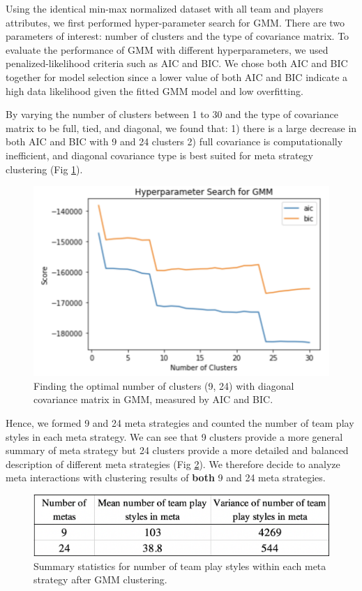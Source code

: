 \documentclass{article}
\begin{document}
Using the identical min-max normalized dataset with all team and players attributes, we first performed hyper-parameter search for GMM. There are two parameters of interest: number of clusters and the type of covariance matrix. To evaluate the performance of GMM with different hyperparameters, we used penalized-likelihood criteria such as AIC and BIC. We chose both AIC and BIC together for model selection since a lower value of both AIC and BIC indicate a high data likelihood given the fitted GMM model and low overfitting.

By varying the number of clusters between 1 to 30 and the type of covariance matrix to be full, tied, and diagonal, we found that: 1) there is a large decrease in both AIC and BIC with 9 and 24 clusters 2) full covariance is computationally inefficient, and diagonal covariance type is best suited for meta strategy clustering (Fig \ref{fig:gmm}).

\begin{figure}[H]
\centering
\includegraphics[width=.5\textwidth]{gmm.png}
\caption{Finding the optimal number of clusters (9, 24) with diagonal covariance matrix in GMM, measured by AIC and BIC.}
\label{fig:gmm}
\end{figure}

Hence, we formed 9 and 24 meta strategies and counted the number of team play styles in each meta strategy. We can see that 9 clusters provide a more general summary of meta strategy but 24 clusters provide a more detailed and balanced description of different meta strategies (Fig \ref{fig:gmm_count}). We therefore decide to analyze meta interactions with clustering results of \textbf{both} 9 and 24 meta strategies.

\begin{figure}[H]
\centering
\includegraphics[width=.7\textwidth]{gmm_count.png}
\caption{Summary statistics for number of team play styles within each meta strategy after GMM clustering.}
\label{fig:gmm_count}
\end{figure}
\end{document}

